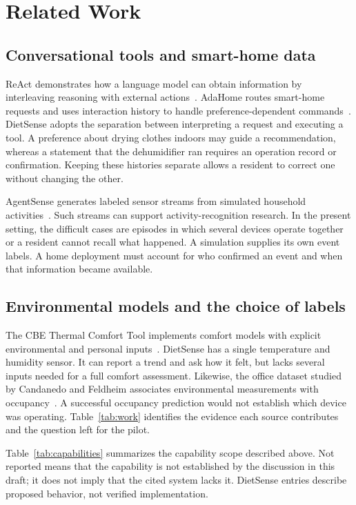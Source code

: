 \section{Related Work}\label{sec:related}
\subsection{Conversational tools and smart-home data}
ReAct demonstrates how a language model can obtain information by interleaving reasoning with external actions~\cite{react}. AdaHome routes smart-home requests and uses interaction history to handle preference-dependent commands~\cite{adahome}. DietSense adopts the separation between interpreting a request and executing a tool. A preference about drying clothes indoors may guide a recommendation, whereas a statement that the dehumidifier ran requires an operation record or confirmation. Keeping these histories separate allows a resident to correct one without changing the other.

AgentSense generates labeled sensor streams from simulated household activities~\cite{agentsense}. Such streams can support activity-recognition research. In the present setting, the difficult cases are episodes in which several devices operate together or a resident cannot recall what happened. A simulation supplies its own event labels. A home deployment must account for who confirmed an event and when that information became available.

\subsection{Environmental models and the choice of labels}
The CBE Thermal Comfort Tool implements comfort models with explicit environmental and personal inputs~\cite{cbe}. DietSense has a single temperature and humidity sensor. It can report a trend and ask how it felt, but lacks several inputs needed for a full comfort assessment. Likewise, the office dataset studied by Candanedo and Feldheim associates environmental measurements with occupancy~\cite{occupancy}. A successful occupancy prediction would not establish which device was operating. Table~\ref{tab:work} identifies the evidence each source contributes and the question left for the pilot.



Table~\ref{tab:capabilities} summarizes the capability scope described above. Not reported means that the capability is not established by the discussion in this draft; it does not imply that the cited system lacks it. DietSense entries describe proposed behavior, not verified implementation.

